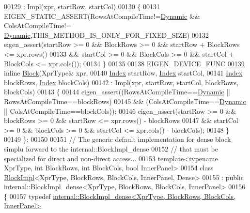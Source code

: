 \begin{DoxyCode}
00129       : Impl(xpr, startRow, startCol)
00130     \{
00131       EIGEN\_STATIC\_ASSERT(RowsAtCompileTime!=\hyperlink{namespace_eigen_ad81fa7195215a0ce30017dfac309f0b2}{Dynamic} && ColsAtCompileTime!=
      \hyperlink{namespace_eigen_ad81fa7195215a0ce30017dfac309f0b2}{Dynamic},THIS\_METHOD\_IS\_ONLY\_FOR\_FIXED\_SIZE)
00132       eigen\_assert(startRow >= 0 && BlockRows >= 0 && startRow + BlockRows <= xpr.rows()
00133              && startCol >= 0 && BlockCols >= 0 && startCol + BlockCols <= xpr.cols());
00134     \}
00135 
00138     EIGEN\_DEVICE\_FUNC
\hyperlink{group___core___module_a09e495968e1c52a5838bfd102978e09e}{00139}     \textcolor{keyword}{inline} \hyperlink{group___core___module_a09e495968e1c52a5838bfd102978e09e}{Block}(XprType& xpr,
00140           \hyperlink{namespace_eigen_a62e77e0933482dafde8fe197d9a2cfde}{Index} startRow, \hyperlink{namespace_eigen_a62e77e0933482dafde8fe197d9a2cfde}{Index} startCol,
00141           \hyperlink{namespace_eigen_a62e77e0933482dafde8fe197d9a2cfde}{Index} blockRows, \hyperlink{namespace_eigen_a62e77e0933482dafde8fe197d9a2cfde}{Index} blockCols)
00142       : Impl(xpr, startRow, startCol, blockRows, blockCols)
00143     \{
00144       eigen\_assert((RowsAtCompileTime==\hyperlink{namespace_eigen_ad81fa7195215a0ce30017dfac309f0b2}{Dynamic} || RowsAtCompileTime==blockRows)
00145           && (ColsAtCompileTime==\hyperlink{namespace_eigen_ad81fa7195215a0ce30017dfac309f0b2}{Dynamic} || ColsAtCompileTime==blockCols));
00146       eigen\_assert(startRow >= 0 && blockRows >= 0 && startRow  <= xpr.rows() - blockRows
00147           && startCol >= 0 && blockCols >= 0 && startCol <= xpr.cols() - blockCols);
00148     \}
00149 \};
00150          
00151 \textcolor{comment}{// The generic default implementation for dense block simplu forward to the internal::BlockImpl\_dense}
00152 \textcolor{comment}{// that must be specialized for direct and non-direct access...}
00153 \textcolor{keyword}{template}<\textcolor{keyword}{typename} XprType, \textcolor{keywordtype}{int} BlockRows, \textcolor{keywordtype}{int} BlockCols, \textcolor{keywordtype}{bool} InnerPanel>
00154 \textcolor{keyword}{class }\hyperlink{class_eigen_1_1_block_impl}{BlockImpl}<XprType, BlockRows, BlockCols, InnerPanel, Dense>
00155   : \textcolor{keyword}{public} \hyperlink{class_eigen_1_1internal_1_1_block_impl__dense}{internal::BlockImpl\_dense}<XprType, BlockRows, BlockCols, InnerPanel>
00156 \{
00157     \textcolor{keyword}{typedef} \hyperlink{class_eigen_1_1internal_1_1_block_impl__dense}{internal::BlockImpl\_dense<XprType, BlockRows, BlockCols, InnerPanel>}

\end{DoxyCode}
